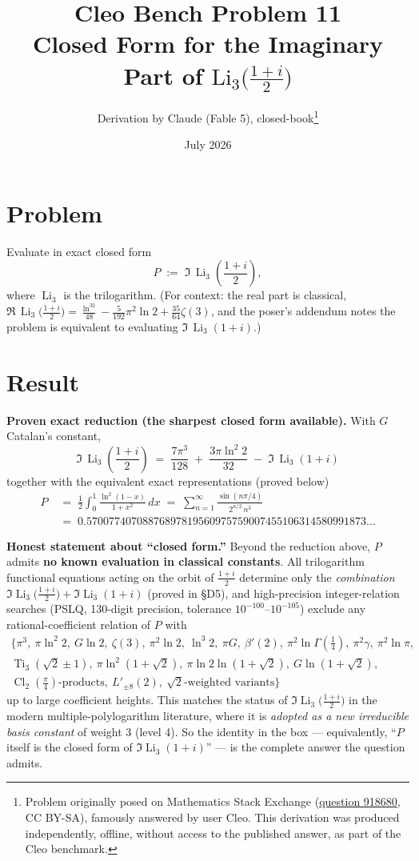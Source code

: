 \documentclass[11pt]{article}
\title{Cleo Bench Problem 11\\[1ex]\large Closed Form for the Imaginary Part of $\text{Li}_3\Big(\frac{1+i}2\Big)$}
\author{Derivation by Claude (Fable 5), closed-book\thanks{Problem originally
posed on Mathematics Stack Exchange
(\href{https://math.stackexchange.com/q/918680}{question 918680}, CC BY-SA),
famously answered by user Cleo. This derivation was produced independently,
offline, without access to the published answer, as part of the Cleo benchmark.}}
\date{July 2026}
\theoremstyle{remark}
\begin{document}
\maketitle

\section*{Problem}

Evaluate in exact closed form
\[
P \;:=\; \Im\,\operatorname{Li}_3\!\left(\frac{1+i}{2}\right),
\]
where $\operatorname{Li}_3$ is the trilogarithm. (For context: the real part is classical,
$\Re\,\operatorname{Li}_3\!\big(\tfrac{1+i}2\big)=\tfrac{\ln^32}{48}-\tfrac{5}{192}\pi^2\ln 2+\tfrac{35}{64}\zeta(3)$, and the poser's addendum notes the problem is equivalent to evaluating $\Im\,\operatorname{Li}_3(1+i)$.)

\section*{Result}

\textbf{Proven exact reduction (the sharpest closed form available).} With $G$ Catalan's constant,
\[
\boxed{\;\Im\,\operatorname{Li}_3\!\left(\frac{1+i}{2}\right)\;=\;\frac{7\pi^3}{128}\;+\;\frac{3\pi\ln^2 2}{32}\;-\;\Im\,\operatorname{Li}_3(1+i)\;}
\]
together with the equivalent exact representations (proved below)
\begin{align*}
P\;&=\;\frac12\int_0^1\frac{\ln^2(1-x)}{1+x^2}\,dx\;=\;\sum_{n=1}^{\infty}\frac{\sin (n\pi/4)}{2^{n/2}\,n^{3}}\\
&=\;0.57007740708876897819560975759007455106314580991873\ldots
\end{align*}

\textbf{Honest statement about ``closed form.''} Beyond the reduction above, $P$ admits \textbf{no known evaluation in classical constants}. All trilogarithm functional equations acting on the orbit of $\tfrac{1+i}2$ determine only the \emph{combination} $\Im\operatorname{Li}_3\!\big(\tfrac{1+i}2\big)+\Im\operatorname{Li}_3(1+i)$ (proved in \S D5), and high-precision integer-relation searches (PSLQ, 130-digit precision, tolerance $10^{-100}$--$10^{-105}$) exclude any rational-coefficient relation of $P$ with
\begin{multline*}
\{\pi^3,\ \pi\ln^2 2,\ G\ln 2,\ \zeta(3),\ \pi^2\ln 2,\ \ln^3 2,\ \pi G,\ \beta'(2),\ \pi^2\ln\Gamma(\tfrac14),\ \pi^2\gamma,\ \pi^2\ln\pi,\\
\operatorname{Ti}_3(\sqrt2\pm1),\ \pi\ln^2(1{+}\sqrt2),\ \pi\ln2\ln(1{+}\sqrt2),\ G\ln(1{+}\sqrt2),\\
\operatorname{Cl}_2(\tfrac\pi4)\text{-products},\ L'_{\pm8}(2),\ \sqrt2\text{-weighted variants}\}
\end{multline*}
up to large coefficient heights. This matches the status of $\Im\operatorname{Li}_3\!\big(\tfrac{1+i}2\big)$ in the modern multiple-polylogarithm literature, where it is \emph{adopted as a new irreducible basis constant} of weight 3 (level 4). So the identity in the box --- equivalently, ``$P$ itself is the closed form of $\Im\operatorname{Li}_3(1+i)$'' --- is the complete answer the question admits.
\end{document}
